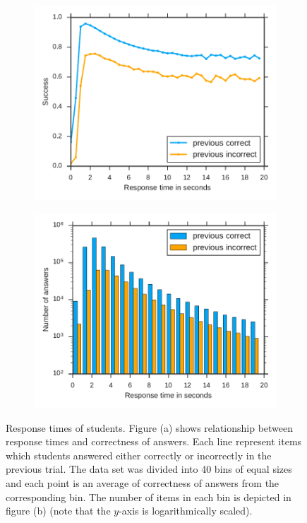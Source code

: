 \begin{figure}[htbp]
  \centering
  \begin{subfigure}{.49\textwidth}
    \centering
    \includegraphics[width=\textwidth]{img/response-times-averaged}
    \caption{}
    \label{fig:response-times-averaged}
  \end{subfigure}
  \begin{subfigure}{.49\textwidth}
    \centering
    \includegraphics[width=\textwidth]{img/response-times-hist}
    \caption{}
    \label{fig:response-times-hist}
  \end{subfigure}
  \caption{Response times of students. Figure (a) shows relationship between response times and correctness of answers. Each line represent items which students answered either correctly or incorrectly in the previous trial. The data set was divided into 40 bins of equal sizes and each point is an average of correctness of answers from the corresponding bin. The number of items in each bin is depicted in figure (b) (note that the $y$-axis is logarithmically scaled).}
  \label{fig:response-times}
\end{figure}

